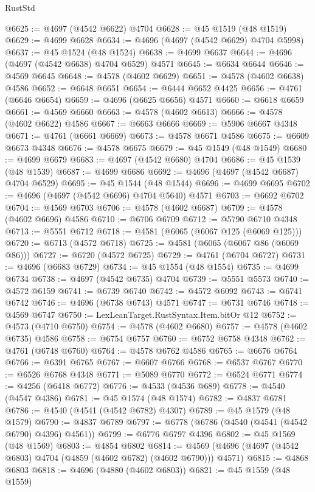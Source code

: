 \begin{lexlean}{RustStd}
\begin{coremodule}
@6625 := @4697 (@4542 @6622) @4704
@6628 := @45 @1519 (@48 @1519)
@6629 := @4699 @6628
@6634 := @4696 (@4697 (@4542 @6629) @4704 @5998)
@6637 := @45 @1524 (@48 @1524)
@6638 := @4699 @6637
@6644 := @4696 (@4697 (@4542 @6638) @4704 @6529) @4571
@6645 := @6634 @6644
@6646 := @4569 @6645
@6648 := @4578 (@4602 @6629)
@6651 := @4578 (@4602 @6638) @4586
@6652 := @6648 @6651
@6654 := @6444 @6652 @4425
@6656 := @4761 (@6646 @6654)
@6659 := @4696 (@6625 @6656) @4571
@6660 := @6618 @6659
@6661 := @4569 @6660
@6663 := @4578 (@4602 @6613)
@6666 := @4578 (@4602 @6622) @4586
@6667 := @6663 @6666
@6669 := @5906 @6667 @4348
@6671 := @4761 (@6661 @6669)
@6673 := @4578 @6671 @4586
@6675 := @6609 @6673 @4348
@6676 := @4578 @6675
@6679 := @45 @1549 (@48 @1549)
@6680 := @4699 @6679
@6683 := @4697 (@4542 @6680) @4704
@6686 := @45 @1539 (@48 @1539)
@6687 := @4699 @6686
@6692 := @4696 (@4697 (@4542 @6687) @4704 @6529)
@6695 := @45 @1544 (@48 @1544)
@6696 := @4699 @6695
@6702 := @4696 (@4697 (@4542 @6696) @4704 @5640) @4571
@6703 := @6692 @6702
@6704 := @4569 @6703
@6706 := @4578 (@4602 @6687)
@6709 := @4578 (@4602 @6696) @4586
@6710 := @6706 @6709
@6712 := @5790 @6710 @4348
@6713 := @5551 @6712
@6718 := @4581 (@6065 (@6067 @125 (@6069 @125)))
@6720 := @6713 (@4572 @6718)
@6725 := @4581 (@6065 (@6067 @86 (@6069 @86)))
@6727 := @6720 (@4572 @6725)
@6729 := @4761 (@6704 @6727)
@6731 := @4696 (@6683 @6729)
@6734 := @45 @1554 (@48 @1554)
@6735 := @4699 @6734
@6738 := @4697 (@4542 @6735) @4704
@6739 := @5551 @5573
@6740 := @4572 @6159
@6741 := @6739 @6740
@6742 := @4572 @6092
@6743 := @6741 @6742
@6746 := @4696 (@6738 @6743) @4571
@6747 := @6731 @6746
@6748 := @4569 @6747
@6750 := LexLeanTarget.RustSyntax.Item.bitOr @12
@6752 := @4573 (@4710 @6750)
@6754 := @4578 (@4602 @6680)
@6757 := @4578 (@4602 @6735) @4586
@6758 := @6754 @6757
@6760 := @6752 @6758 @4348
@6762 := @4761 (@6748 @6760)
@6764 := @4578 @6762 @4586
@6765 := @6676 @6764
@6766 := @6391 @6765
@6767 := @6607 @6766
@6768 := @6537 @6767
@6770 := @6526 @6768 @4348
@6771 := @5089 @6770
@6772 := @6524 @6771
@6774 := @4256 (@6418 @6772)
@6776 := @4533 (@4536 @689)
@6778 := @4540 (@4547 @4386)
@6781 := @45 @1574 (@48 @1574)
@6782 := @4837 @6781
@6786 := @4540 (@4541 (@4542 @6782) @4307)
@6789 := @45 @1579 (@48 @1579)
@6790 := @4837 @6789
@6797 := @6778 (@6786 (@4540 (@4541 (@4542 @6790) @4396) @4561))
@6799 := @6776 @6797 @4396
@6802 := @45 @1569 (@48 @1569)
@6803 := @4854 @6802
@6814 := @4569 (@4696 (@4697 (@4542 @6803) @4704 (@4859 (@4602 @6782) (@4602 @6790))) @4571)
@6815 := @4868 @6803
@6818 := @4696 (@4880 (@4602 @6803))
@6821 := @45 @1559 (@48 @1559)

\end{coremodule}
\end{lexlean}
